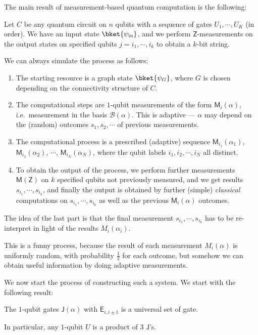 \documentclass[a4paper]{article}
\newcommand{\qE}{\mathsf{E}}
\newcommand{\qJ}{\mathsf{J}}
\newcommand{\qM}{\mathsf{M}}
\newcommand{\qZ}{\mathsf{Z}}
\begin{document}
The main result of measurement-based quantum computation is the following:
\begin{thm}
  Let $C$ be any quantum circuit on $n$ qubits with a sequence of gates $U_1, \cdots, U_K$ (in order). We have an input state $\bket{\psi_{\mathrm{in}}}$, and we perform $\qZ$-measurements on the output states on specified qubits $j = i_1, \cdots, i_k$ to obtain a $k$-bit string.

  We can always simulate the process as follows:
  \begin{enumerate}
    \item The starting resource is a graph state $\bket{\psi_G}$, where $G$ is chosen depending on the connectivity structure of $C$.
    \item The computational steps are $1$-qubit measurements of the form $\qM_i(\alpha)$, i.e.\ measurement in the basis $\mathcal{B}(\alpha)$. This is adaptive --- $\alpha$ may depend on the (random) outcomes $s_1, s_2, \cdots$ of previous measurements.
    \item The computational process is a prescribed (adaptive) sequence $\qM_{i_1}(\alpha_1)$, $\qM_{i_2}(\alpha_2)$, $\cdots$, $\qM_{i_N}(\alpha_N)$, where the qubit labels $i_1, i_2, \cdots, i_N$ all distinct.
    \item To obtain the output of the process, we perform further measurements $\qM(\qZ)$ on $k$ specified qubits not previously measured, and we get results $s_{i_1}, \cdots, s_{i_k}$, and finally the output is obtained by further (simple) \emph{classical} computations on $s_{i_1}, \cdots, s_{i_k}$ as well as the previous $\qM_i(\alpha)$ outcomes.
  \end{enumerate}
\end{thm}
The idea of the last part is that the final measurement $s_{i_1}, \cdots, s_{i_k}$ has to be re-interpret in light of the results $M_i(\alpha_i)$.

This is a funny process, because the result of each measurement $M_i(\alpha)$ is uniformly random, with probability $\frac{1}{2}$ for each outcome, but somehow we can obtain useful information by doing adaptive measurements.

We now start the process of constructing such a system. We start with the following result:
\begin{fact}
  The $1$-qubit gates $\qJ(\alpha)$ with $\qE_{i, i\pm 1}$ is a universal set of gate.

  In particular, any $1$-qubit $U$ is a product of $3$ $\qJ$'s.
\end{fact}
\end{document}

